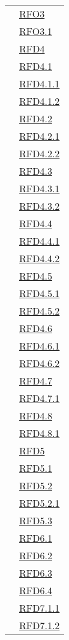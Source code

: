 \begin{longtable}{|>{\centering}m{5cm}|m{5cm}<{\centering}|}
& \hyperlink{RFO3}{RFO3}\\
& \hyperlink{RFO3.1}{RFO3.1}\\
& \hyperlink{RFD4}{RFD4}\\
& \hyperlink{RFD4.1}{RFD4.1}\\
& \hyperlink{RFD4.1.1}{RFD4.1.1}\\
& \hyperlink{RFD4.1.2}{RFD4.1.2}\\
& \hyperlink{RFD4.2}{RFD4.2}\\
& \hyperlink{RFD4.2.1}{RFD4.2.1}\\
& \hyperlink{RFD4.2.2}{RFD4.2.2}\\
& \hyperlink{RFD4.3}{RFD4.3}\\
& \hyperlink{RFD4.3.1}{RFD4.3.1}\\
& \hyperlink{RFD4.3.2}{RFD4.3.2}\\
& \hyperlink{RFD4.4}{RFD4.4}\\
& \hyperlink{RFD4.4.1}{RFD4.4.1}\\
& \hyperlink{RFD4.4.2}{RFD4.4.2}\\
& \hyperlink{RFD4.5}{RFD4.5}\\
& \hyperlink{RFD4.5.1}{RFD4.5.1}\\
& \hyperlink{RFD4.5.2}{RFD4.5.2}\\
& \hyperlink{RFD4.6}{RFD4.6}\\
& \hyperlink{RFD4.6.1}{RFD4.6.1}\\
& \hyperlink{RFD4.6.2}{RFD4.6.2}\\
& \hyperlink{RFD4.7}{RFD4.7}\\
& \hyperlink{RFD4.7.1}{RFD4.7.1}\\
& \hyperlink{RFD4.8}{RFD4.8}\\
& \hyperlink{RFD4.8.1}{RFD4.8.1}\\
& \hyperlink{RFD5}{RFD5}\\
& \hyperlink{RFD5.1}{RFD5.1}\\
& \hyperlink{RFD5.2}{RFD5.2}\\
& \hyperlink{RFD5.2.1}{RFD5.2.1}\\
& \hyperlink{RFD5.3}{RFD5.3}\\
& \hyperlink{RFD6.1}{RFD6.1}\\
& \hyperlink{RFD6.2}{RFD6.2}\\
& \hyperlink{RFD6.3}{RFD6.3}\\
& \hyperlink{RFD6.4}{RFD6.4}\\
& \hyperlink{RFD7.1.1}{RFD7.1.1}\\
& \hyperlink{RFD7.1.2}{RFD7.1.2}\\

\end{longtable}
